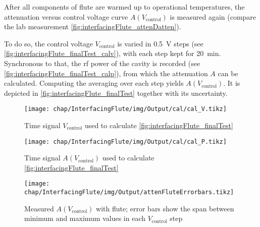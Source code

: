 After all components of \gls{flute} are warmed up to operational temperatures, the attenuation versus control voltage curve $A(V_\text{control})$ is measured again (compare the lab measurement \autoref{fig:interfacingFlute_attenDatten}).

To do so, the control voltage $V_\text{control}$ is varied in \SI{0.5}{\volt} steps (see \autoref{fig:interfacingFlute_finalTest_calv}), with each step kept for \SI{20}{\minute}. Synchronous to that, the \gls{rf} power of the cavity is recorded (see \autoref{fig:interfacingFlute_finalTest_calp}), from which the attenuation $A$ can be calculated. Computing the averaging over each step yields $A(V_\text{control})$. It is depicted in \autoref{fig:interfacingFlute_finalTest} together with its uncertainty.


\begin{figure}[tbh]
	\centering
	\texttt{[image: chap/InterfacingFlute/img/Output/cal/cal\_V.tikz]}
	\caption[Evaluation control voltage signal]{Time signal $V_\text{control}$ used to calculate \autoref{fig:interfacingFlute_finalTest}}
	\label{fig:interfacingFlute_finalTest_calv}
\end{figure}

\begin{figure}[tbh]
	\centering
	\texttt{[image: chap/InterfacingFlute/img/Output/cal/cal\_P.tikz]}
	\caption[Evaluation measured attenuation]{Time signal $A(V_\text{control})$ used to calculate \autoref{fig:interfacingFlute_finalTest}}
	\label{fig:interfacingFlute_finalTest_calp}
\end{figure}

\begin{figure}[tbh]
	\centering
	\texttt{[image: chap/InterfacingFlute/img/Output/attenFluteErrorbars.tikz]}
	\caption[Evaluation attenuation vs control voltage]{Measured $A(V_\text{control})$ with \gls{flute}; error bars show the span between minimum and maximum values in each $V_\text{control}$ step}
	\label{fig:interfacingFlute_finalTest}
\end{figure}



